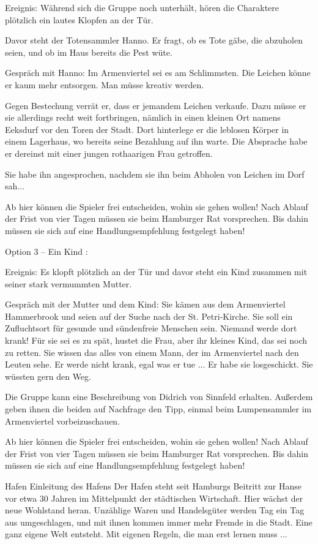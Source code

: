 Ereignis: Während sich die Gruppe noch unterhält, hören die Charaktere plötzlich ein lautes Klopfen an der Tür.

Davor steht der Totensammler Hanno. Er fragt, ob es Tote gäbe, die abzuholen seien, und ob im Haus bereits die Pest wüte.

Gespräch mit Hanno: Im Armenviertel sei es am Schlimmsten. Die Leichen könne er kaum mehr entsorgen. Man müsse kreativ werden.

Gegen Bestechung verrät er, dass er jemandem Leichen verkaufe. Dazu müsse er sie allerdings recht weit fortbringen, nämlich in einen kleinen Ort namens Eeksdurf vor den Toren der Stadt. Dort hinterlege er die leblosen Körper in einem Lagerhaus, wo bereits seine Bezahlung auf ihn warte. Die Absprache habe er dereinst mit einer jungen rothaarigen Frau getroffen.

Sie habe ihn angesprochen, nachdem sie ihn beim Abholen von Leichen im Dorf sah...


Ab hier können die Spieler frei entscheiden, wohin sie gehen wollen! Nach Ablauf der Frist von vier Tagen müssen sie beim Hamburger Rat vorsprechen. Bis dahin müssen sie sich auf eine Handlungsempfehlung festgelegt haben!


Option 3 – Ein Kind
:

Ereignis: Es klopft plötzlich an der Tür und davor steht ein Kind zusammen mit seiner stark vermummten Mutter.

Gespräch mit der Mutter und dem Kind: Sie kämen aus dem Armenviertel Hammerbrook und seien auf der Suche nach der St. Petri-Kirche. Sie soll ein Zufluchtsort für gesunde und sündenfreie Menschen sein. Niemand werde dort krank! Für sie sei es zu spät, hustet die Frau, aber ihr kleines Kind, das sei noch zu retten. Sie wissen das alles von einem Mann, der im Armenviertel nach den Leuten sehe. Er werde nicht krank, egal was er tue ... Er habe sie losgeschickt. Sie wüssten gern den Weg.

Die Gruppe kann eine Beschreibung von Didrich von Sinnfeld erhalten. Außerdem geben ihnen die beiden auf Nachfrage den Tipp, einmal beim Lumpensammler im Armenviertel vorbeizuschauen.


Ab hier können die Spieler frei entscheiden, wohin sie gehen wollen! Nach Ablauf der Frist von vier Tagen müssen sie beim Hamburger Rat vorsprechen. Bis dahin müssen sie sich auf eine Handlungsempfehlung festgelegt haben!


Hafen
Einleitung des Hafens
Der Hafen steht seit Hamburgs Beitritt zur Hanse vor etwa 30 Jahren im Mittelpunkt der städtischen Wirtschaft. Hier wächst der neue Wohlstand heran. Unzählige Waren und Handelsgüter werden Tag ein Tag aus umgeschlagen, und mit ihnen kommen immer mehr Fremde in die Stadt. Eine ganz eigene Welt entsteht. Mit eigenen Regeln, die man erst lernen muss ...

